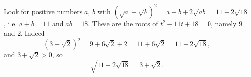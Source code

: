 Look for positive numbers $a$, $b$ with $\left(\sqrt a+\sqrt b\right)^2=a+b+2\sqrt{ab}=11+2\sqrt{18}$, i.e. $a+b=11$ and $ab=18$. These are the roots of $t^2-11t+18=0$, namely $9$ and $2$. Indeed
\[\left(3+\sqrt2\right)^2=9+6\sqrt2+2=11+6\sqrt2=11+2\sqrt{18},\]
and $3+\sqrt2>0$, so
\[\sqrt{11+2\sqrt{18}}=\boxed{3+\sqrt2}.\]
